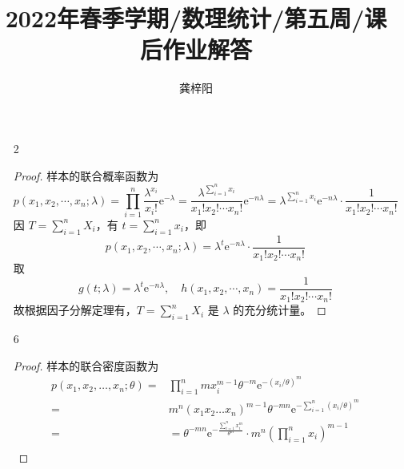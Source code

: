 \documentclass[normal,cn]{elegantnote}
\title{2022年春季学期/数理统计/第五周/课后作业解答}
\author{龚梓阳}
\date{\zhtoday}
\begin{document}
\maketitle
\begin{enumerate}
    \item[2]
        \begin{proof}
            样本的联合概率函数为
            \begin{equation*}
                p\left(x_{1},x_{2},\cdots,x_{n};\lambda\right)=\prod_{i=1}^{n}\frac{\lambda^{x_{i}}}{x_{i}!}\mathrm{e}^{-\lambda}=\frac{\lambda^{\sum_{i=1}^{n}x_{i}}}{x_{1}!x_{2}!\cdots x_{n}!}\mathrm{e}^{-n\lambda}=\lambda^{\sum_{i=1}^{n}x_{i}}\mathrm{e}^{-n\lambda}\cdot\frac{1}{x_{1}!x_{2}!\cdots x_{n}!}
            \end{equation*}
            因 $T=\sum_{i=1}^{n}X_{i}$，有 $t=\sum_{i=1}^{n}x_{i}$，即
            \begin{equation*}
                p\left(x_{1},x_{2},\cdots,x_{n};\lambda\right)=\lambda^{t}\mathrm{e}^{-n\lambda}\cdot\frac{1}{x_{1}!x_{2}!\cdots x_{n}!}
            \end{equation*}
            取
            \begin{equation*}
                g(t;\lambda)=\lambda^{t}\mathrm{e}^{-n\lambda},\quad h\left(x_{1},x_{2},\cdots,x_{n}\right)=\frac{1}{x_{1}!x_{2}!\cdots x_{n}!}
            \end{equation*}
            故根据因子分解定理有，$T=\sum_{i=1}^{n}X_{i}$ 是 $\lambda$ 的充分统计量。
        \end{proof}
    \item[6]
        \begin{proof}
            样本的联合密度函数为
            \begin{equation*}
                \begin{aligned}
                    p\left(x_{1},x_{2},\ldots,x_{n};\theta\right)= & \prod_{i=1}^{n}mx_{i}^{m-1}\theta^{-m}\mathrm{e}^{-\left(x_{i}/\theta\right)^{m}}                                       \\
                    =                                              & m^{n}\left(x_{1} x_{2}\ldots x_{n}\right)^{m-1}\theta^{-mn}\mathrm{e}^{-\sum_{i=1}^{n}\left(x_{i}/\theta\right)^{m}}    \\
                    =                                              & =\theta^{-mn}\mathrm{e}^{-\frac{\sum_{i=1}^{n}x_{i}^{m}}{\theta^{m}}}\cdot m^{n}\left(\prod_{i=1}^{n}x_{i}\right)^{m-1} \\
                \end{aligned}
            \end{equation*}


\end{proof}
\end{enumerate}
\end{document}
